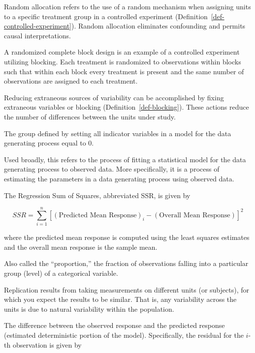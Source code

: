 \documentclass[
  letterpaper,
  DIV=11,
  numbers=noendperiod]{scrreprt}
\providecommand{\tightlist}{%
  \setlength{\itemsep}{0pt}\setlength{\parskip}{0pt}}\usepackage{longtable,booktabs,array}
\theoremstyle{plain}
\theoremstyle{definition}
\theoremstyle{definition}
\theoremstyle{remark}
\begin{document}
Random allocation refers to the use of a random mechanism when assigning
units to a specific treatment group in a controlled experiment
(Definition~\ref{def-controlled-experiment}). Random allocation
eliminates confounding and permits causal interpretations.

\begin{description}
\tightlist
\item[Randomized Complete Block Design (Definition~\ref{def-rcbd})]
A randomized complete block design is an example of a controlled
experiment utilizing blocking. Each treatment is randomized to
observations within blocks such that within each block every treatment
is present and the same number of observations are assigned to each
treatment.
\item[Reduction of Noise (Definition~\ref{def-noise-reduction})]
Reducing extraneous sources of variability can be accomplished by fixing
extraneous variables or blocking (Definition~\ref{def-blocking}). These
actions reduce the number of differences between the units under study.
\item[Reference Group (Definition~\ref{def-reference-group})]
The group defined by setting all indicator variables in a model for the
data generating process equal to 0.
\item[Regression (Definition~\ref{def-regression})]
Used broadly, this refers to the process of fitting a statistical model
for the data generating process to observed data. More specifically, it
is a process of estimating the parameters in a data generating process
using observed data.
\item[Regression Sum of Squares (Definition~\ref{def-ssr})]
The Regression Sum of Squares, abbreviated SSR, is given by
\end{description}

\[SSR = \sum_{i=1}^{n} \left[(\text{Predicted Mean Response})_i - (\text{Overall Mean Response})\right]^2\]

where the predicted mean response is computed using the least squares
estimates and the overall mean response is the sample mean.

\begin{description}
\tightlist
\item[Relative Frequency (Definition~\ref{def-relative-frequency})]
Also called the ``proportion,'' the fraction of observations falling
into a particular group (level) of a categorical variable.
\item[Replication (Definition~\ref{def-replication})]
Replication results from taking measurements on different units (or
subjects), for which you expect the results to be similar. That is, any
variability across the units is due to natural variability within the
population.
\item[Residual (Definition~\ref{def-residual})]
The difference between the observed response and the predicted response
(estimated deterministic portion of the model). Specifically, the
residual for the \(i\)-th observation is given by
\end{description}
\end{document}
